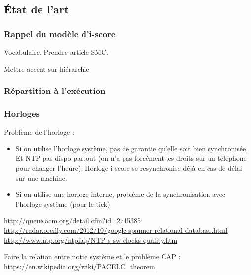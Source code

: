 \documentclass{article}
\newcommand\trigger{point d'interaction\xspace}
\begin{document}

\subsection{État de l'art}
\subsubsection{Rappel du modèle d'i-score}
\cite{celerier2015ossia}
Vocabulaire. Prendre article SMC.

Mettre accent sur hiérarchie
\subsubsection{Répartition à l'exécution}


\subsubsection{Horloges}
Problème de l'horloge : 
\begin{itemize}
\item Si on utilise l'horloge système, pas de garantie qu'elle soit bien synchronisée. 
Et NTP pas dispo partout (on n'a pas forcément les droits sur un téléphone pour changer l'heure).
Horloge i-score se resynchronise déjà en cas de délai sur une machine.
\item Si on utilise une horloge interne, problème de la synchronisation avec l'horloge système (pour le tick)
\end{itemize}

\url{http://queue.acm.org/detail.cfm?id=2745385}
\url{http://radar.oreilly.com/2012/10/google-spanner-relational-database.html}
\url{http://www.ntp.org/ntpfaq/NTP-s-sw-clocks-quality.htm}

Faire la relation entre notre système et le problème CAP : \url{https://en.wikipedia.org/wiki/PACELC_theorem}
\end{document}
